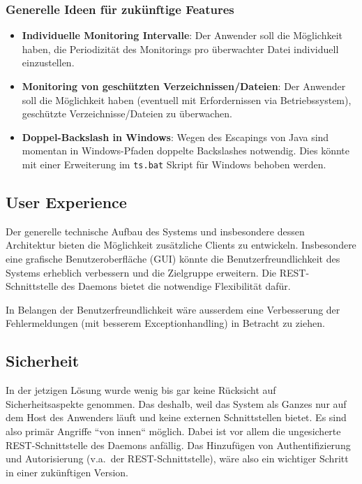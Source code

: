 \documentclass[a4paper,12pt]{report}
\begin{document}
    \subsubsection{Generelle Ideen für zukünftige Features}
    \begin{itemize}
        \item \textbf{Individuelle Monitoring Intervalle}: Der Anwender soll die Möglichkeit haben, die Periodizität des Monitorings pro überwachter Datei individuell einzustellen.
        \item \textbf{Monitoring von geschützten Verzeichnissen/Dateien}: Der Anwender soll die Möglichkeit haben (eventuell mit Erfordernissen via Betriebssystem), geschützte Verzeichnisse/Dateien zu überwachen.
        \item \textbf{Doppel-Backslash in Windows}: Wegen des Escapings von Java sind momentan in Windows-Pfaden doppelte Backslashes notwendig.
        Dies könnte mit einer Erweiterung im \texttt{ts.bat} Skript für Windows behoben werden.
    \end{itemize}


    \subsection{User Experience}\label{subsec:user-experience}
    Der generelle technische Aufbau des Systems und insbesondere dessen Architektur bieten die Möglichkeit zusätzliche Clients zu entwickeln.
    Insbesondere eine grafische Benutzeroberfläche (GUI) könnte die Benutzerfreundlichkeit des Systems erheblich verbessern und die Zielgruppe erweitern.
    Die REST-Schnittstelle des Daemons bietet die notwendige Flexibilität dafür.

    In Belangen der Benutzerfreundlichkeit wäre ausserdem eine Verbesserung der Fehlermeldungen (mit besserem Exceptionhandling) in Betracht zu ziehen.

    \clearpage

    \subsection{Sicherheit}\label{subsec:sicherheit}
    In der jetzigen Lösung wurde wenig bis gar keine Rücksicht auf Sicherheitsaspekte genommen.
    Das deshalb, weil das System als Ganzes nur auf dem Host des Anwenders läuft und keine externen Schnittstellen bietet.
    Es sind also primär Angriffe ``von innen`` möglich.
    Dabei ist vor allem die ungesicherte REST-Schnittstelle des Daemons anfällig.
    Das Hinzufügen von Authentifizierung und Autorisierung (v.a.\ der REST-Schnittstelle), wäre also ein wichtiger Schritt in einer zukünftigen Version.
\end{document}
